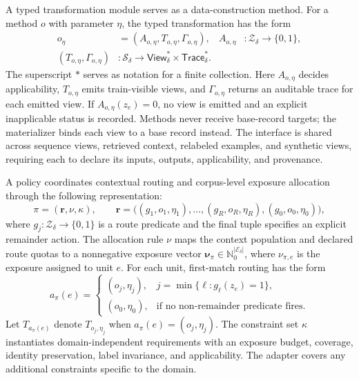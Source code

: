 A typed transformation module serves as a data-construction method.
For a method $o$ with parameter $\eta$, the typed transformation has the form
\begin{equation}
 \begin{aligned}
 o_{\eta}&=\left(A_{o,\eta},T_{o,\eta},\Gamma_{o,\eta}\right),&
 A_{o,\eta}&:\mathcal{Z}_{\delta}\rightarrow\{0,1\},\\
 (T_{o,\eta},\Gamma_{o,\eta})&:
 \mathcal{S}_{\delta}
 \rightarrow\mathsf{View}_{\delta}^{*}\times\mathsf{Trace}_{\delta}^{*}.
 \end{aligned}
 \label{eq:method_tuple}
\end{equation}
The superscript $*$ serves as notation for a finite collection.
Here $A_{o,\eta}$ decides applicability, $T_{o,\eta}$ emits train-visible views, and $\Gamma_{o,\eta}$ returns an auditable trace for each emitted view.
If $A_{o,\eta}(z_e)=0$, no view is emitted and an explicit inapplicable status is recorded.
Methods never receive base-record targets; the materializer binds each view to a base record instead.
The interface is shared across sequence views, retrieved context, relabeled examples, and synthetic views, requiring each to declare its inputs, outputs, applicability, and provenance.

A policy coordinates contextual routing and corpus-level exposure allocation through the following representation:
\begin{equation}
 \pi=\left(\mathbf{r},\nu,\kappa\right),\qquad
 \mathbf{r}=\big((g_1,o_1,\eta_1),\ldots,(g_R,o_R,\eta_R),(g_0,o_0,\eta_0)\big),
 \label{eq:policy_tuple}
\end{equation}
where $g_j:\mathcal{Z}_{\delta}\rightarrow\{0,1\}$ is a route predicate and the final tuple specifies an explicit remainder action.
The allocation rule $\nu$ maps the context population and declared route quotas to a nonnegative exposure vector $\boldsymbol{\nu}_{\pi}\in\mathbb{N}_0^{|\mathcal{E}_{\delta}|}$, where $\nu_{\pi,e}$ is the exposure assigned to unit $e$.
For each unit, first-match routing has the form
\begin{equation}
 a_{\pi}(e)=
 \begin{cases}
 (o_j,\eta_j), & j=\min\{\ell:g_\ell(z_e)=1\},\\
 (o_0,\eta_0), & \text{if no non-remainder predicate fires}.
 \end{cases}
 \label{eq:policy_action}
\end{equation}
Let $T_{a_{\pi}(e)}$ denote $T_{o_j,\eta_j}$ when $a_{\pi}(e)=(o_j,\eta_j)$.
The constraint set $\kappa$ instantiates domain-independent requirements with an exposure budget, coverage, identity preservation, label invariance, and applicability.
The adapter covers any additional constraints specific to the domain.

